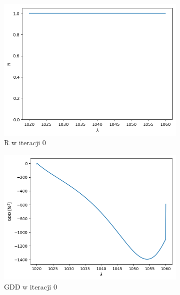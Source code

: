 \begin{figure} [H]
    \centering
    \begin{subfigure}[b]{0.30\textwidth}
        \includegraphics[width=\linewidth]{figures/wyniki/2stopien/morebees/result_Rresult0.png}
        \caption{R w iteracji 0}
    \end{subfigure}
            \begin{subfigure}[b]{0.31\textwidth}
        \includegraphics[width=\linewidth]{figures/wyniki/2stopien/morebees/result_gddresult0.png}
        \caption{GDD w iteracji 0}
    \end{subfigure}
        \begin{subfigure}[b]{0.32\textwidth}

\end{subfigure}
\end{figure}
